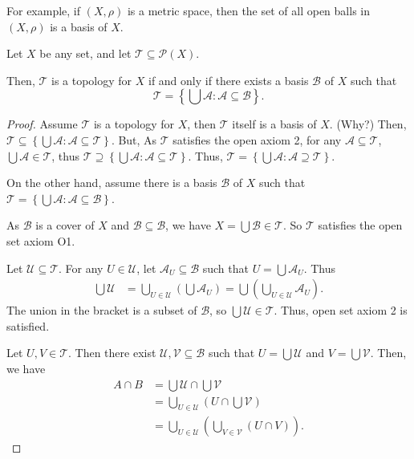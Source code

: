 \documentclass{report}
\begin{document}
For example, if $(X, \rho)$ is a metric space, then the set of all open balls in $(X, \rho)$ is a basis of $X$.

\begin{lemma}
	Let $X$ be any set, and let $\mathcal T \subseteq \mathcal P(X)$.
	
	Then, $\mathcal T$ is a topology for $X$ if and only if there exists a basis $\mathcal B$ of $X$ such that
	$$
	\mathcal T = \left\{ \bigcup \mathcal A: \mathcal A \subseteq \mathcal B \right\}.
	$$
	
	\begin{proof}
		Assume $\mathcal T$ is a topology for $X$, then $\mathcal T$ itself is a basis of $X$. (Why?) Then, $\mathcal T \subseteq \left\{ \bigcup \mathcal A : \mathcal A \subseteq \mathcal T \right\}$. But, As $\mathcal T$ satisfies the open axiom 2, for any $\mathcal A \subseteq \mathcal T$, $\bigcup \mathcal A \in \mathcal T$, thus $\mathcal T \supseteq \left\{ \bigcup \mathcal A : \mathcal A \subseteq \mathcal T \right\}$.
		Thus, $\mathcal T = \left\{ \bigcup \mathcal A : \mathcal A \supseteq \mathcal T \right\}$.
		\qedlm
		
		On the other hand, assume there is a basis $\mathcal B$ of $X$ such that $\mathcal T = \left\{ \bigcup \mathcal A: \mathcal A \subseteq \mathcal B \right\}$.
		
		As $\mathcal B$ is a cover of $X$ and $\mathcal B \subseteq \mathcal B$, we have $X = \bigcup \mathcal B \in \mathcal T$. So $\mathcal T$ satisfies the open set axiom O1.
		
		Let $\mathcal U \subseteq \mathcal T$. For any $U \in \mathcal U$, let $\mathcal A_U \subseteq \mathcal B$ such that $U = \bigcup \mathcal A_U$. Thus
		$$
		\begin{aligned}
			\bigcup \mathcal U &= \bigcup_{U \in \mathcal U} \left( \bigcup \mathcal A_U \right) = \bigcup \left( \bigcup_{U \in \mathcal U} \mathcal A_U \right).
		\end{aligned}
		$$
		The union in the bracket is a subset of $\mathcal B$, so $\bigcup \mathcal U \in \mathcal T$. Thus, open set axiom 2 is satisfied.
		
		Let $U, V \in \mathcal T$. Then there exist $\mathcal U, \mathcal V \subseteq \mathcal B$ such that $U = \bigcup \mathcal U$ and $V = \bigcup \mathcal V$. Then, we have
		$$
		\begin{aligned}
			A \cap B &= \bigcup \mathcal U \cap \bigcup \mathcal V \\
			&= \bigcup_{U \in \mathcal U} \left( U \cap \bigcup \mathcal V \right) \\
			&= \bigcup_{U \in \mathcal U} \left( \bigcup_{V \in \mathcal V} (U \cap V) \right).
		\end{aligned}
		$$
		

\end{proof}
\end{lemma}
\end{document}
